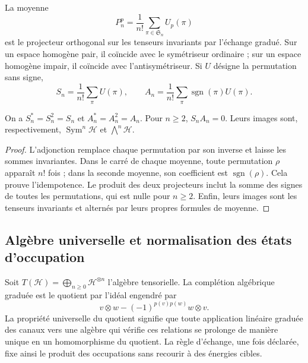 La moyenne
\[
 P_n^p=\frac1{n!}\sum_{\pi\in\mathfrak S_n}U_p(\pi)
\]
est le projecteur orthogonal sur les tenseurs invariants par
l’échange gradué. Sur un espace homogène pair, il coïncide avec le
symétriseur ordinaire ; sur un espace homogène impair, il coïncide avec
l’antisymétriseur. Si \(U\) désigne la permutation sans signe,
\begin{equation}
 S_n=\frac1{n!}\sum_\pi U(\pi),\qquad
 A_n=\frac1{n!}\sum_\pi\operatorname{sgn}(\pi)U(\pi).
 \label{vi:vi:eq:simetrizadores-fock}
\end{equation}

\begin{proposition}
\label{vi:vi:prop:proyectores-fock}
On a \(S_n^*=S_n^2=S_n\) et \(A_n^*=A_n^2=A_n\).
Pour \(n\ge2\), \(S_nA_n=0\). Leurs images sont, respectivement,
\(\operatorname{Sym}^n\mathcal H\) et \(\bigwedge^n\mathcal H\).
\end{proposition}
\begin{proof}
L’adjonction remplace chaque permutation par son inverse et laisse
les sommes invariantes. Dans le carré de chaque moyenne, toute
permutation \(\rho\) apparaît \(n!\) fois ; dans la seconde moyenne,
son coefficient est \(\operatorname{sgn}(\rho)\). Cela prouve
l’idempotence. Le produit des deux projecteurs inclut la somme
des signes de toutes les permutations, qui est nulle pour
\(n\ge2\). Enfin, leurs images sont les tenseurs invariants
et alternés par leurs propres formules de moyenne.
\end{proof}

\subsection{Algèbre universelle et normalisation des états d’occupation}
\label{vi:vi:subsec:fock-construccion}

Soit \(T(\mathcal H)=\bigoplus_{n\ge0}\mathcal H^{\otimes n}\)
l’algèbre tensorielle. La complétion algébrique graduée est le
quotient par l’idéal engendré par
\begin{equation}
 v\otimes w-(-1)^{p(v)p(w)}w\otimes v.
 \label{vi:vi:eq:ideal-fock}
\end{equation}
La propriété universelle du quotient signifie que toute application
linéaire graduée des canaux vers une algèbre qui vérifie ces
relations se prolonge de manière unique en un homomorphisme du
quotient. La règle d’échange, une fois déclarée, fixe ainsi le
produit des occupations sans recourir à des énergies cibles.

